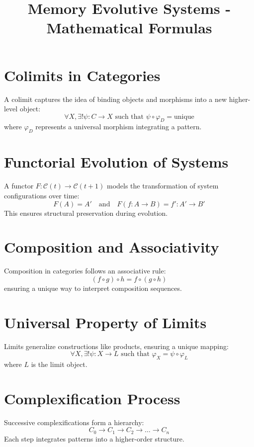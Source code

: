 \documentclass{article}
\title{Memory Evolutive Systems - Mathematical Formulas}
\author{}
\date{}
\begin{document}
\maketitle

\section{Colimits in Categories}
A colimit captures the idea of binding objects and morphisms into a new higher-level object:
\begin{equation}
    \forall X, \exists! \psi: C \to X \text{ such that } \psi \circ \varphi_D = \text{unique}
\end{equation}
where $\varphi_D$ represents a universal morphism integrating a pattern.

\section{Functorial Evolution of Systems}
A functor $F: \mathcal{C}(t) \to \mathcal{C}(t+1)$ models the transformation of system configurations over time:
\begin{equation}
    F(A) = A' \quad \text{and} \quad F(f: A \to B) = f': A' \to B'
\end{equation}
This ensures structural preservation during evolution.

\section{Composition and Associativity}
Composition in categories follows an associative rule:
\begin{equation}
    (f \circ g) \circ h = f \circ (g \circ h)
\end{equation}
ensuring a unique way to interpret composition sequences.

\section{Universal Property of Limits}
Limits generalize constructions like products, ensuring a unique mapping:
\begin{equation}
    \forall X, \exists! \psi: X \to L \text{ such that } \varphi_X = \psi \circ \varphi_L
\end{equation}
where $L$ is the limit object.

\section{Complexification Process}
Successive complexifications form a hierarchy:
\begin{equation}
    C_0 \to C_1 \to C_2 \to \dots \to C_n
\end{equation}
Each step integrates patterns into a higher-order structure.
\end{document}
